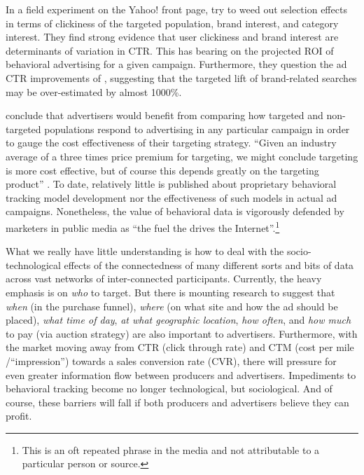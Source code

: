 In a field experiment on the Yahoo! front page,  \cite{Farahat:2012ex}  try to weed out selection effects in terms of clickiness of the targeted population, brand interest, and category interest. They find strong evidence that user clickiness and brand interest are determinants of variation in CTR. This has bearing on the projected ROI of behavioral advertising for a given campaign. Furthermore, they question the ad CTR improvements of  \cite{Yan:2009dk},  suggesting that the targeted lift of brand-related searches may be over-estimated by almost 1000\%.

 \cite{Farahat:2012ex}  conclude that advertisers would benefit from comparing how targeted and non-targeted populations respond to advertising in any particular campaign in order to gauge the cost effectiveness of their targeting strategy. ``Given an industry average of a three times price premium for targeting, we might conclude targeting is more cost effective, but of course this depends greatly on the targeting product''  \citep{Farahat:2012ex}.  To date, relatively little is published about proprietary behavioral tracking model development nor the effectiveness of such models in actual ad campaigns. Nonetheless, the value of behavioral data is vigorously defended by marketers in public media as ``the fuel the drives the Internet''.\footnote{This is an oft repeated phrase in the media and not attributable to a particular person or source.}

What we really have little understanding is how to deal with the socio-technological effects of the connectedness of many different sorts and bits of data across vast networks of inter-connected participants. Currently, the heavy emphasis is on \emph{who} to target. But there is mounting research to suggest that \emph{when} (in the purchase funnel), \emph{where} (on what site and how the ad should be placed), \emph{what time of day}, \emph{at what geographic location}, \emph{how often}, and \emph{how much} to pay (via auction strategy) are also important to advertisers. Furthermore, with the market moving away from CTR (click through rate) and CTM (cost per mile \slash  ``impression'') towards a sales conversion rate (CVR), there will pressure for even greater information flow between producers and advertisers. Impediments to behavioral tracking become no longer technological, but sociological. And of course, these barriers will fall if both producers and advertisers believe they can profit.

